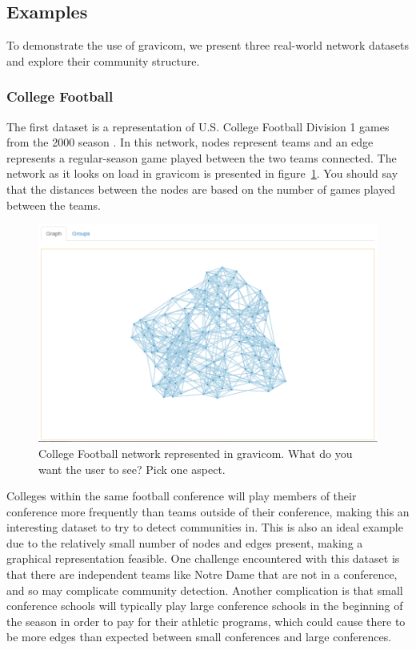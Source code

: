 \documentclass{article}\usepackage[]{graphicx}\usepackage[]{color}
\newcommand{\hh}[1]{{\color{magenta} #1}}
\begin{document}
\subsection{Examples}

To demonstrate the use of gravicom, we present three real-world network datasets and explore their community structure.

\subsubsection{College Football}
The first dataset is a representation of U.S. College Football Division 1 games from the 2000 season \cite{gn-football}. In this network, nodes represent teams and an edge represents a regular-season game played between the two teams connected. The network as it looks on load in gravicom is presented in figure~\ref{fig:football_1}. 
\hh{You should say that the distances between the nodes are based on the number of games played between the teams.}

\begin{figure}[H]
\centering
\includegraphics[width=\textwidth]{images/football_1.png}
\caption{\label{fig:football_1} College Football network represented in gravicom. \hh{What do you want the user to see? Pick one aspect.}}
\end{figure}

Colleges within the same football conference will play members of their conference more frequently than teams outside of their conference, making this an interesting dataset to try to detect communities in. This is also an ideal example due to the relatively small number of nodes and edges present, making a graphical representation feasible. One challenge encountered with this dataset is that there are independent teams like Notre Dame that are not in a conference, and so may complicate community detection. Another complication is that small conference schools will typically play large conference schools in the beginning of the season in order to pay for their athletic programs, which could cause there to be more edges than expected between small conferences and large conferences.
\end{document}
